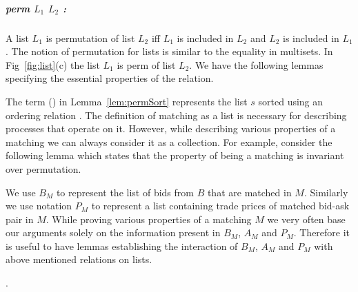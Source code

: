 \documentclass[a4paper,UKenglish,cleveref, autoref]{lipics-v2019}
\begin{document}
\subparagraph*{perm $L_1$ $L_2$ :} A list $L_1$  is permutation of list $L_2$  iff $L_1$  is included in $L_2$ and $L_2$ is included in $L_1$.  The notion of permutation for lists is similar to the equality in multisets. In Fig~\ref{fig:list}(c) the list $L_1$  is perm of list $L_2$. We have the following lemmas specifying the essential properties of the  relation.

\begin{lemma}
\end{lemma}
\begin{lemma}
\end{lemma}
\begin{lemma}\label{lem:permSort}
\end{lemma}

The term (\emph{}) in Lemma~\ref{lem:permSort} represents the list $s$ sorted using an ordering relation . The definition of matching as a list is necessary for describing processes that operate on it. However, while describing various properties of a matching we can always consider it as a collection. For example, consider the following lemma which states that the property of  being a matching is invariant over permutation. 
\begin{lemma}
\end{lemma}
We use $B_M$ to represent the list of bids from $B$ that are matched in  $M$. Similarly we  use notation $P_M$ to represent  a list containing trade prices of matched bid-ask pair in $M$. While proving various properties of a matching $M$ we very often base our arguments solely on the information present in $B_M$, $A_M$ and $P_M$. Therefore it is useful to have lemmas establishing the interaction of  $B_M$, $A_M$ and $P_M$ with above mentioned relations on lists. 

\begin{lemma}
.
\end{lemma}

\begin{lemma}
\end{lemma}
\end{document}
